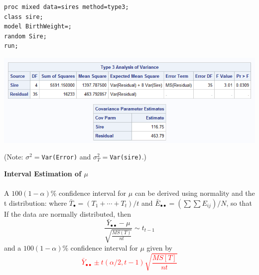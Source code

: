 \begin{small}
\begin{verbatim}
proc mixed data=sires method=type3;                 
class sire;                          
model BirthWeight=;              
random Sire;                         
run;                                 
\end{verbatim}
\end{small}

\begin{center}
\includegraphics[scale=0.8]{Sire2}
\end{center}

(Note:  $\sigma^2=${\tt Var(Error)}  and $\sigma_T^2=${\tt Var(sire)}.)  

\newpage

\newpage
\textbf{Interval Estimation of $\mu$}\\~\\
A $100(1-\alpha)\%$ confidence interval for $\mu$ can be derived using normality and the t distribution:
where $\bar{T}_{\bullet}=(T_1 + \cdots + T_t)/t$ and $\bar{E}_{\bullet\bullet}=(\sum \sum E_{ij})/N$,
so that
If the data are normally distributed, then 
$$\frac{\bar{Y}_{\bullet\bullet}-\mu}{\sqrt{\frac{MS(T)}{nt}}} \sim t_{t-1}$$
and a $100(1-\alpha)\%$ confidence interval for $\mu$ given by
\textcolor{red}{$$\bar{Y}_{\bullet\bullet} \pm t(\alpha/2,t-1) \sqrt{\frac{MS[T]}{nt}}$$}

